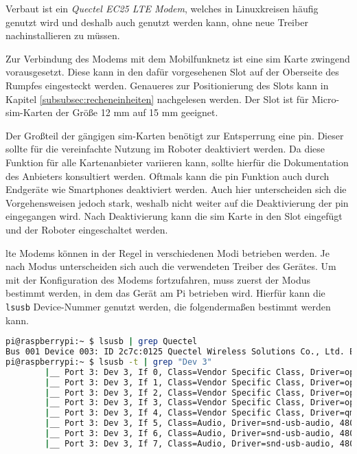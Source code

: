 Verbaut ist ein \emph{Quectel EC25 LTE Modem}, welches in Linuxkreisen häufig genutzt wird und deshalb auch
genutzt werden kann, ohne neue Treiber nachinstallieren zu müssen.


Zur Verbindung des Modems mit dem Mobilfunknetz ist eine \gls{sim} Karte zwingend vorausgesetzt.
Diese kann in den dafür vorgesehenen Slot auf der Oberseite des Rumpfes eingesteckt werden.
Genaueres zur Positionierung des Slots kann in Kapitel \ref{subsubsec:recheneinheiten} nachgelesen werden.
Der Slot ist für Micro-\gls{sim}-Karten der Größe \num{12} mm auf \num{15} mm geeignet.

Der Großteil der gängigen \gls{sim}-Karten benötigt zur Entsperrung eine \gls{pin}.
Dieser sollte für die vereinfachte Nutzung im Roboter deaktiviert werden.
Da diese Funktion für alle Kartenanbieter variieren kann, sollte hierfür die Dokumentation des Anbieters konsultiert werden.
Oftmals kann die \gls{pin} Funktion auch durch Endgeräte wie Smartphones deaktiviert werden.
Auch hier unterscheiden sich die Vorgehensweisen jedoch stark, weshalb nicht weiter auf die Deaktivierung der \gls{pin}
eingegangen wird.
Nach Deaktivierung kann die \gls{sim} Karte in den Slot eingefügt und der Roboter eingeschaltet werden.



\gls{lte} Modems können in der Regel in verschiedenen Modi betrieben werden.
Je nach Modus unterscheiden sich auch die verwendeten Treiber des Gerätes.
Um mit der Konfiguration des Modems fortzufahren, muss zuerst der Modus bestimmt werden, in dem das Gerät am Pi betrieben wird.
Hierfür kann die \texttt{lsusb} Device-Nummer genutzt werden, die folgendermaßen bestimmt werden kann.

\begin{lstlisting}[language=Bash]
pi@raspberrypi:~ $ lsusb | grep Quectel
Bus 001 Device 003: ID 2c7c:0125 Quectel Wireless Solutions Co., Ltd. EC25 LTE modem
pi@raspberrypi:~ $ lsusb -t | grep "Dev 3"
        |__ Port 3: Dev 3, If 0, Class=Vendor Specific Class, Driver=option, 480M
        |__ Port 3: Dev 3, If 1, Class=Vendor Specific Class, Driver=option, 480M
        |__ Port 3: Dev 3, If 2, Class=Vendor Specific Class, Driver=option, 480M
        |__ Port 3: Dev 3, If 3, Class=Vendor Specific Class, Driver=option, 480M
        |__ Port 3: Dev 3, If 4, Class=Vendor Specific Class, Driver=qmi_wwan, 480M
        |__ Port 3: Dev 3, If 5, Class=Audio, Driver=snd-usb-audio, 480M
        |__ Port 3: Dev 3, If 6, Class=Audio, Driver=snd-usb-audio, 480M
        |__ Port 3: Dev 3, If 7, Class=Audio, Driver=snd-usb-audio, 480M
\end{lstlisting}

